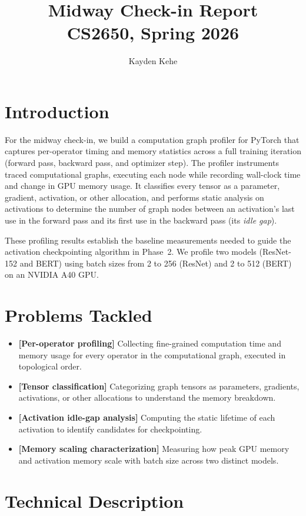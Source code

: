 \documentclass[11pt]{article}
\title{\vspace{-1em}\textbf{Midway Check-in Report} \\ CS2650, Spring 2026\vspace{-0.5em}}
\author{Kayden Kehe}
\date{\vspace{-2em}}
\begin{document}
\maketitle

\section{Introduction}

For the midway check-in, we build a computation graph profiler for PyTorch that captures per-operator timing and memory statistics across a full training iteration (forward pass, backward pass, and optimizer step). The profiler instruments traced computational graphs, executing each node while recording wall-clock time and change in GPU memory usage. It classifies every tensor as a parameter, gradient, activation, or other allocation, and performs static analysis on activations to determine the number of graph nodes between an activation's last use in the forward pass and its first use in the backward pass (its \emph{idle gap}).

These profiling results establish the baseline measurements needed to guide the activation checkpointing algorithm in Phase~2. We profile two models (ResNet-152 and BERT) using batch sizes from 2 to 256 (ResNet) and 2 to 512 (BERT) on an NVIDIA A40 GPU.

\section{Problems Tackled}

\begin{itemize}[nosep]
\item \textbf{[Per-operator profiling]} Collecting fine-grained computation time and memory usage for every operator in the computational graph, executed in topological order.
\item \textbf{[Tensor classification]} Categorizing graph tensors as parameters, gradients, activations, or other allocations to understand the memory breakdown.
\item \textbf{[Activation idle-gap analysis]} Computing the static lifetime of each activation to identify candidates for checkpointing.
\item \textbf{[Memory scaling characterization]} Measuring how peak GPU memory and activation memory scale with batch size across two distinct models.
\end{itemize}

\section{Technical Description}
\end{document}
